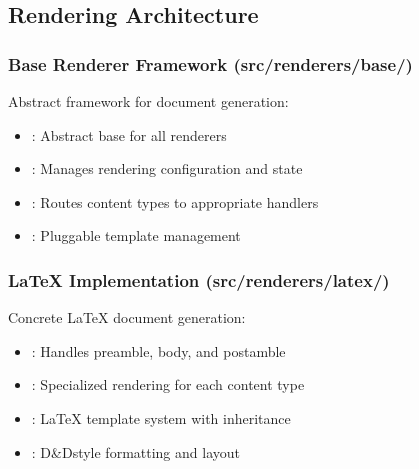 \documentclass[letterpaper,10pt,english]{sphinxmanual}
\begin{document}
\subsection{Rendering Architecture}
\label{\detokenize{developer/architecture:rendering-architecture}}

\subsubsection{Base Renderer Framework (src/renderers/base/)}
\label{\detokenize{developer/architecture:base-renderer-framework-src-renderers-base}}
\sphinxAtStartPar
Abstract framework for document generation:
\begin{itemize}
\item {} 
\sphinxAtStartPar
{}: Abstract base for all renderers

\item {} 
\sphinxAtStartPar
{}: Manages rendering configuration and state

\item {} 
\sphinxAtStartPar
{}: Routes content types to appropriate handlers

\item {} 
\sphinxAtStartPar
{}: Pluggable template management

\end{itemize}


\subsubsection{LaTeX Implementation (src/renderers/latex/)}
\label{\detokenize{developer/architecture:latex-implementation-src-renderers-latex}}
\sphinxAtStartPar
Concrete LaTeX document generation:
\begin{itemize}
\item {} 
\sphinxAtStartPar
{}: Handles preamble, body, and postamble

\item {} 
\sphinxAtStartPar
{}: Specialized rendering for each content type

\item {} 
\sphinxAtStartPar
{}: LaTeX template system with inheritance

\item {} 
\sphinxAtStartPar
{}: D\&D\sphinxhyphen{}style formatting and layout

\end{itemize}
\end{document}
